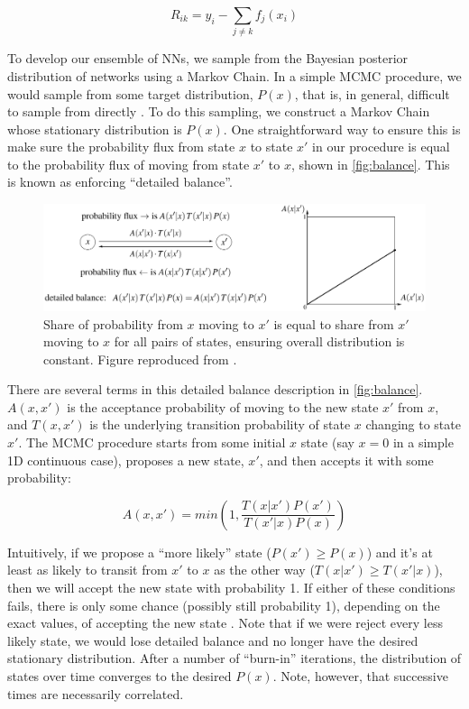 \documentclass[12pt]{article}
\begin{document}
$$
R_{ik} = y_i - \sum_{j\neq k} f_j(x_i)
$$

To develop our ensemble of NNs, we sample from the Bayesian posterior distribution of networks using a Markov Chain.  In a simple MCMC procedure, we would sample from some target distribution, $P(x)$, that is, in general, difficult to sample from directly \cite{haugh2021tutorial}.  To do this sampling, we construct a Markov Chain whose stationary distribution is $P(x)$.  One straightforward way to ensure this is make sure the probability flux from state $x$ to state $x'$ in our procedure is equal to the probability flux of moving from state $x'$ to $x$, shown in \autoref{fig:balance}.  This is known as enforcing ``detailed balance''.

\begin{figure}[htb]
\centering
    \includegraphics[scale=0.4]{figs/balance.png}
    \caption{Share of probability from $x$ moving to $x'$ is equal to share from $x'$ moving to $x$ for all pairs of states, ensuring overall distribution is constant.  Figure reproduced from \cite{stepanov2021math}.}
    \label{fig:balance}
\end{figure}

There are several terms in this detailed balance description in \autoref{fig:balance}.  $A(x,x')$ is the acceptance probability of moving to the new state $x'$ from $x$, and $T(x,x')$ is the underlying transition probability of state $x$ changing to state $x'$.  The MCMC procedure starts from some initial $x$ state (say $x=0$ in a simple 1D continuous case), proposes a new state, $x'$, and then accepts it with some probability:

$$
A(x,x') = min(1, \frac{T(x|x') P(x')}{T(x'|x) P(x)})
$$

Intuitively, if we propose a ``more likely'' state ($P(x') \geq P(x)$) and it's at least as likely to transit from $x'$ to $x$ as the other way ($T(x|x') \geq T(x'|x)$), then we will accept the new state with probability 1.  If either of these conditions fails, there is only some chance (possibly still probability 1), depending on the exact values, of accepting the new state \cite{stepanov2021math}.  Note that if we were reject every less likely state, we would lose detailed balance and no longer have the desired stationary distribution.  After a number of ``burn-in'' iterations, the distribution of states over time converges to the desired $P(x)$.  Note, however, that successive times are necessarily correlated.
\end{document}

